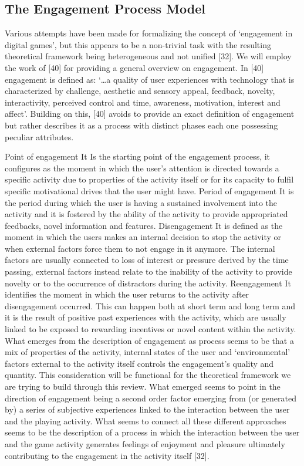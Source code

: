 \subsection{The Engagement Process Model}
\label{eng_proc_model}
Various attempts have been made for formalizing the concept of ‘engagement in digital games’, but this appears to be a non-trivial task with the resulting theoretical framework being heterogeneous and not unified [32]. We will employ the work of [40] for providing a general overview on engagement. In [40] engagement is defined as:
‘…a quality of user experiences with technology that is characterized by challenge, aesthetic and sensory appeal, feedback, novelty, interactivity, perceived control and time, awareness, motivation, interest and affect’.
Building on this, [40] avoids to provide an exact definition of engagement but rather describes it as a process with distinct phases each one possessing peculiar attributes.

Point of engagement
It Is the starting point of the engagement process, it configures as the moment in which the user’s attention is directed towards a specific activity due to properties of the activity itself or for its capacity to fulfil specific motivational drives that the user might have.
Period of engagement
It is the period during which the user is having a sustained involvement into the activity and it is fostered by the ability of the activity to provide appropriated feedbacks, novel information and features.
Disengagement
It is defined as the moment in which the users makes an internal decision to stop the activity or when external factors force them to not engage in it anymore. The internal factors are usually connected to loss of interest or pressure derived by the time passing, external factors instead relate to the inability of the activity to provide novelty or to the occurrence of distractors during the activity.
Reengagement
It identifies the moment in which the user returns to the activity after disengagement occurred. This can happen both at short term and long term and it is the result of positive past experiences with the activity, which are usually linked to be exposed to rewarding incentives or novel content within the activity.
What emerges from the description of engagement as process seems to be that a mix of properties of the activity, internal states of the user and ‘environmental’ factors external to the activity itself controls the engagement’s quality and quantity. This consideration will be functional for the theoretical framework we are trying to build through this review. What emerged seems to point in the direction of engagement being a second order factor emerging from (or generated by) a series of subjective experiences linked to the interaction between the user and the playing activity. What seems to connect all these different approaches seems to be the description of a process in which the interaction between the user and the game activity generates feelings of enjoyment and pleasure ultimately contributing to the engagement in the activity itself [32].

